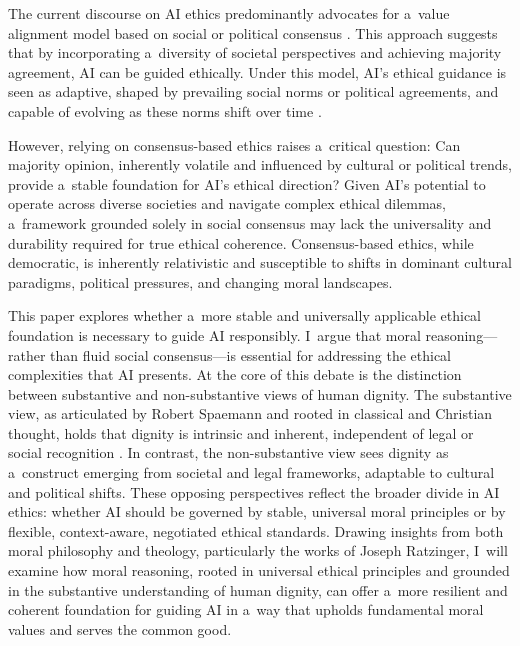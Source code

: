 \documentclass[%
  manuscript=article,
  year=2024,
  volume=77,
  doi=10.59203/zfn.77.707,
]{zfn}
\begin{document}
The current discourse on AI ethics predominantly advocates for a~value alignment model based on social or political consensus 
\parencite[][]{gabriel_artificial_2020}. %
 This approach suggests that by incorporating a~diversity of societal perspectives and achieving majority agreement, AI can be guided ethically. Under this model, AI's ethical guidance is seen as adaptive, shaped by prevailing social norms or political agreements, and capable of evolving as these norms shift over time 
\parencite[][]{world_economic_forum_ai_2024}.%




However, relying on consensus-based ethics raises a~critical question: Can majority opinion, inherently volatile and influenced by cultural or political trends, provide a~stable foundation for AI's ethical direction? Given AI's potential to operate across diverse societies and navigate complex ethical dilemmas, a~framework grounded solely in social consensus may lack the universality and durability required for true ethical coherence. Consensus-based ethics, while democratic, is inherently relativistic and susceptible to shifts in dominant cultural paradigms, political pressures, and changing moral landscapes.



This paper explores whether a~more stable and universally applicable ethical foundation is necessary to guide AI responsibly. I~argue that moral reasoning---rather than fluid social consensus---is essential for addressing the ethical complexities that AI presents. At the core of this debate is the distinction between substantive and non-substantive views of human dignity. The substantive view, as articulated by Robert Spaemann and rooted in classical and Christian thought, holds that dignity is intrinsic and inherent, independent of legal or social recognition 
\parencite[][]{spaemann_love_2012}. %
 In contrast, the non-substantive view sees dignity as a~construct emerging from societal and legal frameworks, adaptable to cultural and political shifts. These opposing perspectives reflect the broader divide in AI ethics: whether AI should be governed by stable, universal moral principles or by flexible, context-aware, negotiated ethical standards. Drawing insights from both moral philosophy and theology, particularly the works of Joseph Ratzinger, I~will examine how moral reasoning, rooted in universal ethical principles and grounded in the substantive understanding of human dignity, can offer a~more resilient and coherent foundation for guiding AI in a~way that upholds fundamental moral values and serves the common good.
\end{document}
